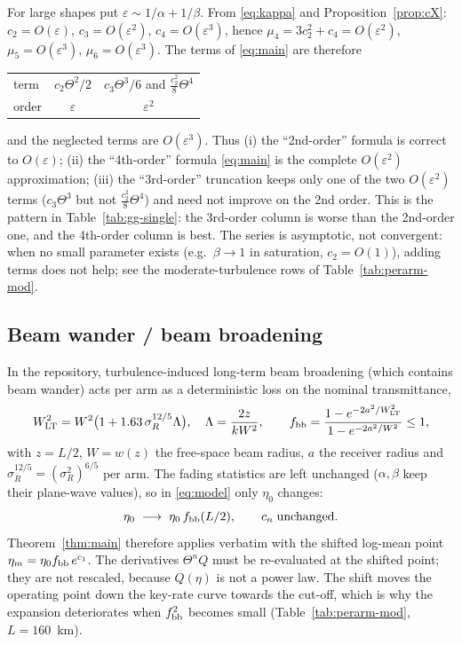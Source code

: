 For large shapes put $\varepsilon\sim1/\alpha+1/\beta$. From \eqref{eq:kappa} and Proposition~\ref{prop:cX}: $c_2=O(\varepsilon)$, $c_3=O(\varepsilon^{2})$, $c_4=O(\varepsilon^{3})$, hence $\mu_4=3c_2^2+c_4=O(\varepsilon^{2})$, $\mu_5=O(\varepsilon^{3})$, $\mu_6=O(\varepsilon^{3})$. The terms of \eqref{eq:main} are therefore
\begin{center}
\begin{tabular}{lcc}
\toprule
term & $c_2\Theta^2/2$ & $c_3\Theta^3/6$ \;and\; $\tfrac{c_2^2}{8}\Theta^4$ \\
order & $\varepsilon$ & $\varepsilon^{2}$ \\
\bottomrule
\end{tabular}
\end{center}
and the neglected terms are $O(\varepsilon^{3})$. Thus (i) the ``2nd-order'' formula is correct to $O(\varepsilon)$; (ii) the ``4th-order'' formula \eqref{eq:main} is the complete $O(\varepsilon^{2})$ approximation; (iii) the ``3rd-order'' truncation keeps only one of the two $O(\varepsilon^{2})$ terms ($c_3\Theta^3$ but not $\tfrac{c_2^2}{8}\Theta^4$) and need not improve on the 2nd order. This is the pattern in Table~\ref{tab:gg-single}: the 3rd-order column is worse than the 2nd-order one, and the 4th-order column is best. The series is asymptotic, not convergent: when no small parameter exists (e.g.\ $\beta\to1$ in saturation, $c_2=O(1)$), adding terms does not help; see the moderate-turbulence rows of Table~\ref{tab:perarm-mod}.

\subsection{Beam wander / beam broadening}
\label{sec:bb}

In the repository, turbulence-induced long-term beam broadening (which contains beam wander) acts per arm as a deterministic loss on the nominal transmittance,
\begin{equation}
  W_{\rm LT}^2=W^2\big(1+1.63\,\sigma_R^{12/5}\Lambda\big),\quad \Lambda=\frac{2z}{kW^2},\qquad
  f_{\rm bb}=\frac{1-e^{-2a^2/W_{\rm LT}^2}}{1-e^{-2a^2/W^2}}\le1,
\end{equation}
with $z=L/2$, $W=w(z)$ the free-space beam radius, $a$ the receiver radius and $\sigma_R^{12/5}=(\sigma_R^2)^{6/5}$ per arm. The fading statistics are left unchanged ($\alpha,\beta$ keep their plane-wave values), so in \eqref{eq:model} only $\eta_0$ changes:
\begin{equation}
  \eta_0\;\longrightarrow\;\eta_0\,f_{\rm bb}(L/2),\qquad c_n\;\text{unchanged}.
\end{equation}
Theorem~\ref{thm:main} therefore applies verbatim with the shifted log-mean point $\eta_m=\eta_0f_{\rm bb}\,e^{c_1}$. The derivatives $\Theta^nQ$ must be re-evaluated at the shifted point; they are not rescaled, because $Q(\eta)$ is not a power law. The shift moves the operating point down the key-rate curve towards the cut-off, which is why the expansion deteriorates when $f_{\rm bb}^2$ becomes small (Table~\ref{tab:perarm-mod}, $L=160$~km).

